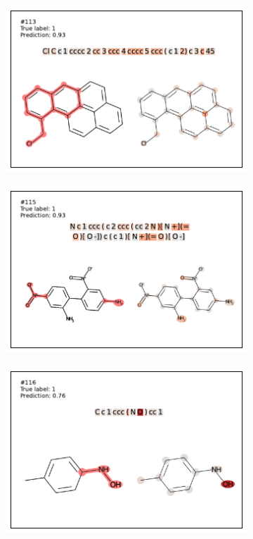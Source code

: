 \begin{figure}
\begin{subfigure}[b]{0.33\textwidth}
\end{subfigure}\begin{subfigure}[b]{0.33\textwidth} 
  \centering 
  \includegraphics[width=\textwidth]{figures/ames/ames113.pdf} 
\end{subfigure} 
\begin{subfigure}[b]{0.33\textwidth} 
  \centering 
  \includegraphics[width=\textwidth]{figures/ames/ames115.pdf} 
\end{subfigure}\begin{subfigure}[b]{0.33\textwidth} 
  \centering 
  \includegraphics[width=\textwidth]{figures/ames/ames116.pdf} 

\end{subfigure}
\end{figure}
